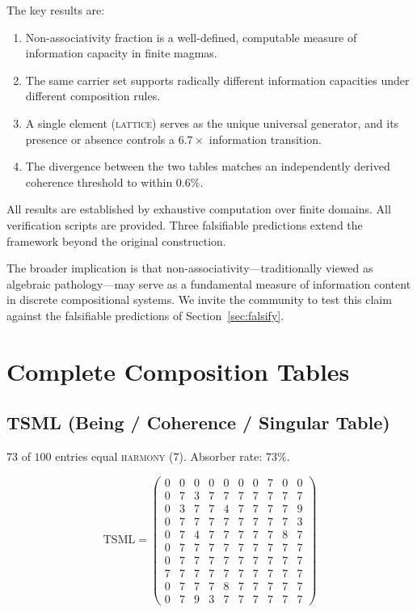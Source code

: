 \documentclass[11pt,a4paper]{article}
\theoremstyle{definition}
\theoremstyle{remark}
\newcommand{\TSML}{\mathrm{TSML}}
\begin{document}
The key results are:
\begin{enumerate}[label=(\arabic*)]
\item Non-associativity fraction is a well-defined, computable measure of information capacity in finite magmas.
\item The same carrier set supports radically different information capacities under different composition rules.
\item A single element (\textsc{lattice}) serves as the unique universal generator, and its presence or absence controls a $6.7\times$ information transition.
\item The divergence between the two tables matches an independently derived coherence threshold to within $0.6\%$.
\end{enumerate}

All results are established by exhaustive computation over finite domains. All verification scripts are provided. Three falsifiable predictions extend the framework beyond the original construction.

The broader implication is that non-associativity---traditionally viewed as algebraic pathology---may serve as a fundamental measure of information content in discrete compositional systems. We invite the community to test this claim against the falsifiable predictions of Section~\ref{sec:falsify}.

\appendix

\section{Complete Composition Tables}\label{app:tables}

\subsection{TSML (Being / Coherence / Singular Table)}\label{app:tsml}

$73$ of $100$ entries equal \textsc{harmony} ($7$). Absorber rate: $73\%$.

\[
\TSML = \begin{pmatrix}
0 & 0 & 0 & 0 & 0 & 0 & 0 & 7 & 0 & 0\\
0 & 7 & 3 & 7 & 7 & 7 & 7 & 7 & 7 & 7\\
0 & 3 & 7 & 7 & 4 & 7 & 7 & 7 & 7 & 9\\
0 & 7 & 7 & 7 & 7 & 7 & 7 & 7 & 7 & 3\\
0 & 7 & 4 & 7 & 7 & 7 & 7 & 7 & 8 & 7\\
0 & 7 & 7 & 7 & 7 & 7 & 7 & 7 & 7 & 7\\
0 & 7 & 7 & 7 & 7 & 7 & 7 & 7 & 7 & 7\\
7 & 7 & 7 & 7 & 7 & 7 & 7 & 7 & 7 & 7\\
0 & 7 & 7 & 7 & 8 & 7 & 7 & 7 & 7 & 7\\
0 & 7 & 9 & 3 & 7 & 7 & 7 & 7 & 7 & 7
\end{pmatrix}
\]
\end{document}
